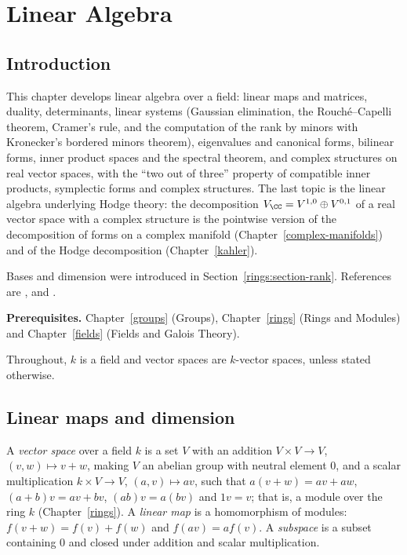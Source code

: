 \chapter{Linear Algebra}\label{linear-algebra}

\section{Introduction}\label{linear-algebra:section-introduction}

This chapter develops linear algebra over a field: linear maps and matrices, duality,
determinants, linear systems (Gaussian elimination, the Rouch\'e--Capelli theorem, Cramer's rule, and the computation
of the rank by minors with Kronecker's bordered minors theorem), eigenvalues and canonical forms, bilinear forms, inner product spaces
and the spectral theorem, and complex structures on real vector spaces, with the ``two out of three''
property of compatible inner products, symplectic forms and complex structures. The last topic
is the linear algebra underlying Hodge theory: the decomposition
$V_\CC = V^{1,0} \oplus V^{0,1}$ of a real vector space with a complex structure is the
pointwise version of the decomposition of forms on a complex manifold
(Chapter~\ref{complex-manifolds}) and of the Hodge decomposition
(Chapter~\ref{kahler}).

Bases and dimension were introduced in Section~\ref{rings:section-rank}. References are
\cite{halmos-fdvs}, \cite{axler-linear} and \cite[Chapters XIII--XV]{lang-algebra}.

\noindent\textbf{Prerequisites.} Chapter~\ref{groups} (Groups),
Chapter~\ref{rings} (Rings and Modules) and Chapter~\ref{fields} (Fields and Galois
Theory).

Throughout, $k$ is a field and vector spaces are $k$-vector spaces, unless stated
otherwise.

\section{Linear maps and dimension}\label{linear-algebra:section-dimension}

\begin{definition}\label{linear-algebra:definition-vector-space}
A \emph{vector space} over a field $k$ is a set $V$ with an addition $V \times V \to V$, $(v, w) \mapsto v + w$, making $V$ an abelian group with neutral element $0$, and a scalar multiplication
$k \times V \to V$, $(a, v) \mapsto av$, such that $a(v + w) = av + aw$, $(a + b)v = av + bv$, $(ab)v = a(bv)$ and $1v = v$; that is, a module over the ring $k$ (Chapter~\ref{rings}). A
\emph{linear map} is a homomorphism of modules: $f(v + w) = f(v) + f(w)$ and $f(av) = af(v)$. A \emph{subspace} is a subset containing $0$ and closed under addition and scalar multiplication.
\end{definition}

